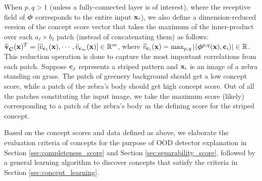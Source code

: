 When $p, q > 1$ (unless a fully-connected layer is of interest), where the receptive field of $\bm{\phi}$ corresponds to the entire input $\mathbf{x}_i$), we also define a dimension-reduced version of the concept score vector that takes the maximum of the inner-product over each $a_\ell \times b_\ell$ patch (instead of concatenating them) as follows: $\widetilde{\mathbf{v}}^{}_{\mathbf{C}}(\mathbf{x})^T = [\widetilde{v}_{\mathbf{c}_1}(\mathbf{x}), \cdots, \widetilde{v}_{\mathbf{c}_m}(\mathbf{x})] \in \mathbb{R}^m$, where $\widetilde{v}_{\mathbf{c}_i}(\mathbf{x}) = \max_{p, q} |\langle \bm{\phi}^{p,q}(\mathbf{x}), \mathbf{c}_i \rangle| \in \mathbb{R}$.
This reduction operation is done to capture the most important correlations from each patch.
Suppose $\mathbf{c}_j$ represents a striped pattern and $\mathbf{x}_i$ is an image of a zebra standing on grass.
The patch of greenery background should get a low concept score, while a patch of the zebra's body should get high concept score.
Out of all the patches constituting the input image, we take the maximum score (likely) corresponding to a patch of the zebra's body as the defining score for the striped concept.

Based on the concept scores and data defined as above, we elaborate the evaluation criteria of concepts for the purpose of OOD detector explanation in Section \ref{sec:completeness_score} and Section \ref{sec:separability_score}, followed by a general learning algorithm to discover concepts that satisfy the criteria in Section \ref{sec:concept_learning}.


\fi



